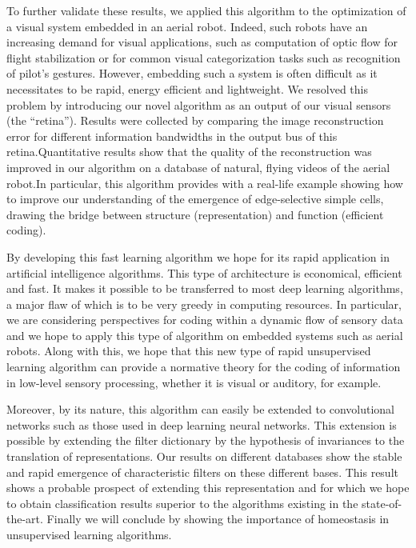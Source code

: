 \documentclass[a4paper, 11pt, draft]{article} %
\begin{document}

To further validate these results, we applied this algorithm to the optimization of a visual system embedded in an aerial robot. Indeed, such robots have an increasing demand for visual applications, such as computation of optic flow for flight stabilization or for common visual categorization tasks such as recognition of pilot's gestures. However, embedding such a system is often difficult as it necessitates to be rapid, energy efficient and lightweight. We resolved this problem by introducing our novel algorithm as an output of our visual sensors (the ``retina''). Results were collected by comparing the image reconstruction error for different information bandwidths in the output bus of this retina.Quantitative results show that the quality of the reconstruction was improved in our algorithm on a database of natural, flying videos of the aerial robot.In particular, this algorithm provides with a real-life example showing how to improve our understanding of the emergence of edge-selective simple cells, drawing the bridge between structure (representation) and function (efficient coding).%
%


 By developing this
fast learning algorithm we hope for its rapid application in artificial
intelligence algorithms. This type of architecture is economical,
efficient and fast. It makes it possible to be transferred to most deep
learning algorithms, a major flaw of which is to be very greedy in
computing resources. In particular, we are considering perspectives for
coding within a dynamic flow of sensory data and we hope to apply this
type of algorithm on embedded systems such as aerial robots. Along with
this, we hope that this new type of rapid unsupervised learning
algorithm can provide a normative theory for the coding of information
in low-level sensory processing, whether it is visual or auditory, for
example.

Moreover, by its nature, this algorithm can easily be extended to convolutional networks such as those used in deep learning neural networks. This extension is possible by extending the filter dictionary by the hypothesis of invariances to the translation of representations. Our results on different databases show the stable and rapid emergence of characteristic filters on these different bases. This result shows a probable prospect of extending this representation and for which we hope to obtain classification results superior to the algorithms existing in the state-of-the-art. Finally we will conclude by showing the importance of homeostasis in unsupervised learning algorithms.
\end{document}
